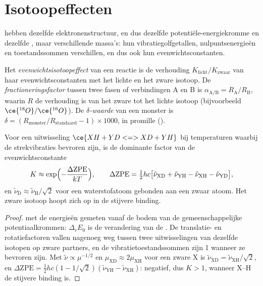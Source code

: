 \section{Isotoopeffecten}

 hebben dezelfde elektronenstructuur, en dus dezelfde
potentiële-energiekromme en dezelfde , maar verschillende
massa's: hun vibratiegolfgetallen, nulpuntsenergieën en toestandssommen
verschillen, en dus ook hun evenwichtsconstanten.

\begin{definition}\label{def:b3:statistical-thermo-applied:isotope-effect}
Het \emph{evenwichtsisotoopeffect} van een
reactie is de verhouding $K_{\mathrm{licht}}/K_{\mathrm{zwaar}}$ van haar
evenwichtsconstanten met het lichte en het zware isotoop. De
\emph{fractioneringsfactor}
tussen twee fasen of verbindingen A en B is $\alpha_{\mathrm{A/B}} = R_{\mathrm A}/R_{\mathrm B}$, waarin
$R$ de verhouding is van het zware tot het lichte isotoop (bijvoorbeeld
$\ce{^{18}O}/\ce{^{16}O}$). De
\emph{$\delta$-waarde} van een monster is $\delta = (R_{\mathrm{monster}}/R_{\mathrm{standaard}}
- 1) \times 1000$, in promille (\textperthousand).
\end{definition}

\begin{proposition}\label{prop:b3:statistical-thermo-applied:zpe-isotope}
Voor een uitwisseling $\ce{XH + YD <=> XD + YH}$ bij temperaturen waarbij
de strekvibraties bevroren zijn, is de dominante factor van de
evenwichtsconstante
\[
  K \approx \exp\Bigl(-\frac{\Delta\mathrm{ZPE}}{kT}\Bigr), \qquad
  \Delta\mathrm{ZPE} = \tfrac12hc\bigl[\tilde\nu_{\mathrm{XD}} + \tilde\nu_{\mathrm{YH}} - \tilde\nu_{\mathrm{XH}} - \tilde\nu_{\mathrm{YD}}\bigr],
\]
en $\tilde\nu_{\mathrm D} \approx \tilde\nu_{\mathrm H}/\sqrt2$ voor een
waterstofatoom gebonden aan een zwaar atoom. Het zware isotoop hoopt zich
op in de stijvere binding.
\end{proposition}

\begin{proof}
 met de energieën gemeten
vanaf de bodem van de gemeenschappelijke potentiaalkrommen: $\Delta_rE_0$
is de verandering van de . De translatie- en
rotatiefactoren vallen nagenoeg weg tussen twee uitwisselingen van
dezelfde isotopen op zware partners, en de vibratietoestandssommen zijn 1
wanneer ze bevroren zijn. Met $\tilde\nu \propto \mu^{-1/2}$ en
$\mu_{\mathrm{XD}} \approx 2\mu_{\mathrm{XH}}$ voor een zware X is $\tilde\nu_{\mathrm{XD}} = \tilde\nu_{\mathrm{XH}}/\sqrt2$, en $\Delta\mathrm{ZPE} =
\frac12hc(1 - 1/\sqrt2)(\tilde\nu_{\mathrm{YH}} - \tilde\nu_{\mathrm{XH}})$:
negatief, dus $K > 1$, wanneer X--H de
stijvere binding is.
\end{proof}

